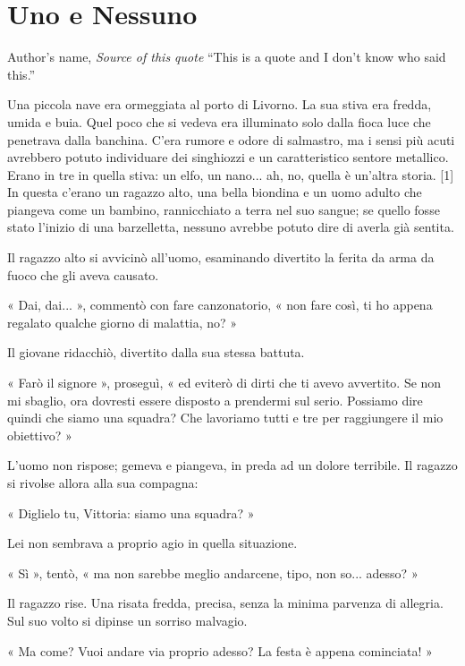 \chapter{Uno e Nessuno}

\begin{chapquote}{Author's name, \textit{Source of this quote}}
``This is a quote and I don't know who said this.''
\end{chapquote}


Una piccola nave era ormeggiata al porto di Livorno. La sua stiva era fredda, umida e buia. Quel poco che si vedeva era illuminato solo dalla fioca luce che penetrava dalla banchina. C'era rumore e odore di salmastro, ma i sensi più acuti avrebbero potuto individuare dei singhiozzi e un caratteristico sentore metallico. Erano in tre in quella stiva: un elfo, un nano... ah, no, quella è un'altra storia. [1] In questa c'erano un ragazzo alto, una bella biondina e un uomo adulto che piangeva come un bambino, rannicchiato a terra nel suo sangue; se quello fosse stato l'inizio di una barzelletta, nessuno avrebbe potuto dire di averla già sentita.

Il ragazzo alto si avvicinò all'uomo, esaminando divertito la ferita da arma da fuoco che gli aveva causato.

« Dai, dai... », commentò con fare canzonatorio, « non fare così, ti ho appena regalato qualche giorno di malattia, no? »

Il giovane ridacchiò, divertito dalla sua stessa battuta.

« Farò il signore », proseguì, « ed eviterò di dirti che ti avevo avvertito. Se non mi sbaglio, ora dovresti essere disposto a prendermi sul serio. Possiamo dire quindi che siamo una squadra? Che lavoriamo tutti e tre per raggiungere il mio obiettivo? »

L'uomo non rispose; gemeva e piangeva, in preda ad un dolore terribile. Il ragazzo si rivolse allora alla sua compagna:

« Diglielo tu, Vittoria: siamo una squadra? »

Lei non sembrava a proprio agio in quella situazione.

« Sì », tentò, « ma non sarebbe meglio andarcene, tipo, non so... adesso? »

Il ragazzo rise. Una risata fredda, precisa, senza la minima parvenza di allegria. Sul suo volto si dipinse un sorriso malvagio.

« Ma come? Vuoi andare via proprio adesso? La festa è appena cominciata! »

